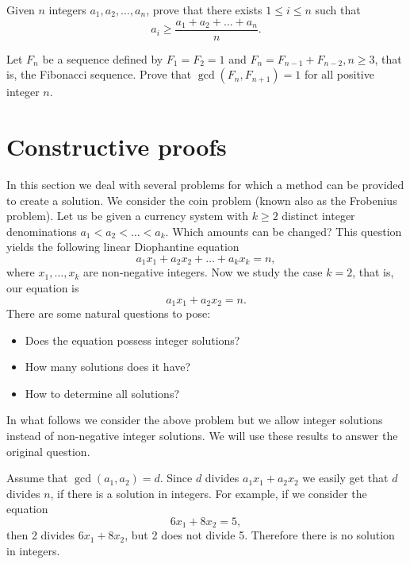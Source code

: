 \begin{exercise}\label{contra-3}
Given $n$ integers $a_1,a_2,\ldots,a_n$, prove that there exists $1\leq i\leq n$
such that
$$
a_i\geq \frac{a_1+a_2+\ldots+a_n}{n}.
$$
\end{exercise}

\begin{exercise}\label{contra-4}
Let $F_n$ be a sequence defined by $F_1=F_2=1$ and $F_n=F_{n-1}+F_{n-2}, n\geq 3$, that is, the Fibonacci sequence.
Prove that $\gcd(F_n,F_{n+1})=1$ for all positive integer $n$.
\end{exercise}



\section{Constructive proofs}
In this section we deal with several problems for which a method can be provided to create a solution.
We consider the coin problem (known also as the Frobenius problem). Let us be given a currency system with
$k\geq 2$ distinct integer denominations $a_1<a_2<\ldots<a_k$. Which amounts can be changed? This question
yields the following linear Diophantine equation
$$
a_1x_1+a_2x_2+\ldots+a_kx_k=n,
$$
where $x_1,\ldots,x_k$ are non-negative integers. Now we study the case $k=2$, that is, our equation is
$$
a_1x_1+a_2x_2=n.
$$
There are some natural questions to pose:
\begin{itemize}
\item
Does the equation possess integer solutions?
\item
How many solutions does it have?
\item
How to determine all solutions?
\end{itemize}

In what follows we consider the above problem but we allow integer solutions instead of non-negative integer 
solutions. We will use these results to answer the original question.

Assume that $\gcd(a_1,a_2)=d$. Since $d$ divides $a_1x_1+a_2x_2$ we easily get that $d$ divides $n$,
if there is a solution in integers. For example, if we consider the equation
$$
6x_1+8x_2=5,
$$
then 2 divides $6x_1+8x_2$, but 2 does not divide 5. Therefore there is no solution in integers.

